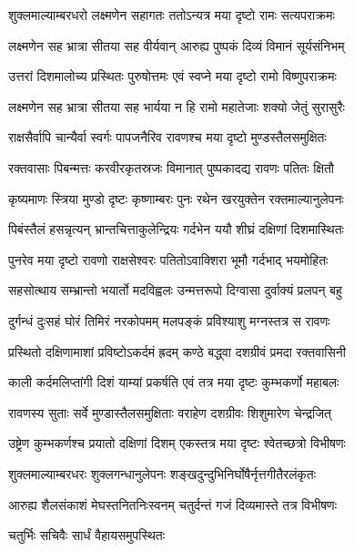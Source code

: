 \twolineshloka
{शुक्लमाल्याम्बरधरो लक्ष्मणेन सहागतः}
{ततोऽन्यत्र मया दृष्टो रामः सत्यपराक्रमः} %

\twolineshloka
{लक्ष्मणेन सह भ्रात्रा सीतया सह वीर्यवान्}
{आरुह्य पुष्पकं दिव्यं विमानं सूर्यसंनिभम्} %

\twolineshloka
{उत्तरां दिशमालोच्य प्रस्थितः पुरुषोत्तमः}
{एवं स्वप्ने मया दृष्टो रामो विष्णुपराक्रमः} %

\twolineshloka
{लक्ष्मणेन सह भ्रात्रा सीतया सह भार्यया}
{न हि रामो महातेजाः शक्यो जेतुं सुरासुरैः} %

\twolineshloka
{राक्षसैर्वापि चान्यैर्वा स्वर्गः पापजनैरिव}
{रावणश्च मया दृष्टो मुण्डस्तैलसमुक्षितः} %

\twolineshloka
{रक्तवासाः पिबन्मत्तः करवीरकृतस्रजः}
{विमानात् पुष्पकादद्य रावणः पतितः क्षितौ} %

\twolineshloka
{कृष्यमाणः स्त्रिया मुण्डो दृष्टः कृष्णाम्बरः पुनः}
{रथेन खरयुक्तेन रक्तमाल्यानुलेपनः} %

\twolineshloka
{पिबंस्तैलं हसन्नृत्यन् भ्रान्तचित्ताकुलेन्द्रियः}
{गर्दभेन ययौ शीघ्रं दक्षिणां दिशमास्थितः} %

\twolineshloka
{पुनरेव मया दृष्टो रावणो राक्षसेश्वरः}
{पतितोऽवाक्शिरा भूमौ गर्दभाद् भयमोहितः} %

\twolineshloka
{सहसोत्थाय सम्भ्रान्तो भयार्तो मदविह्वलः}
{उन्मत्तरूपो दिग्वासा दुर्वाक्यं प्रलपन् बहु} %

\twolineshloka
{दुर्गन्धं दुःसहं घोरं तिमिरं नरकोपमम्}
{मलपङ्कं प्रविश्याशु मग्नस्तत्र स रावणः} %

\twolineshloka
{प्रस्थितो दक्षिणामाशां प्रविष्टोऽकर्दमं ह्रदम्}
{कण्ठे बद्ध्वा दशग्रीवं प्रमदा रक्तवासिनी} %

\twolineshloka
{काली कर्दमलिप्तांगी दिशं याम्यां प्रकर्षति}
{एवं तत्र मया दृष्टः कुम्भकर्णो महाबलः} %

\twolineshloka
{रावणस्य सुताः सर्वे मुण्डास्तैलसमुक्षिताः}
{वराहेण दशग्रीवः शिशुमारेण चेन्द्रजित्} %

\twolineshloka
{उष्ट्रेण कुम्भकर्णश्च प्रयातो दक्षिणां दिशम्}
{एकस्तत्र मया दृष्टः श्वेतच्छत्रो विभीषणः} %

\twolineshloka
{शुक्लमाल्याम्बरधरः शुक्लगन्धानुलेपनः}
{शङ्खदुन्दुभिनिर्घोषैर्नृत्तगीतैरलंकृतः} %

\twolineshloka
{आरुह्य शैलसंकाशं मेघस्तनितनिःस्वनम्}
{चतुर्दन्तं गजं दिव्यमास्ते तत्र विभीषणः} %

\onelineshloka
{चतुर्भिः सचिवैः सार्धं वैहायसमुपस्थितः} %

